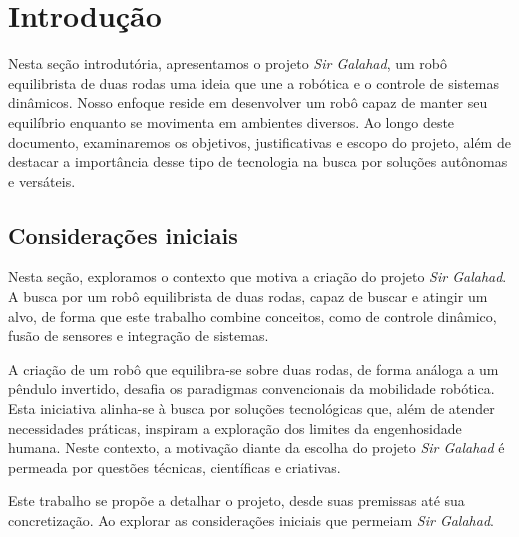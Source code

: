 
\chapter{Introdução}\label{cap:introducao}

Nesta seção introdutória, apresentamos o projeto \textit{Sir Galahad}, um robô equilibrista de duas rodas uma ideia que une a robótica e o controle de sistemas dinâmicos. Nosso enfoque reside em desenvolver um robô capaz de manter seu equilíbrio enquanto se movimenta em ambientes diversos. Ao longo deste documento, examinaremos os objetivos, justificativas e escopo do projeto, além de destacar a importância desse tipo de tecnologia na busca por soluções autônomas e versáteis.

\section{\textbf{Considerações iniciais}}

Nesta seção, exploramos o contexto que motiva a criação do projeto \textit{Sir Galahad}. A busca por um robô equilibrista de duas rodas, capaz de buscar e atingir um alvo, de forma que este trabalho combine conceitos, como de controle dinâmico, fusão de sensores e integração de sistemas. 

A criação de um robô que equilibra-se sobre duas rodas, de forma análoga a um pêndulo invertido, desafia os paradigmas convencionais da mobilidade robótica. Esta iniciativa alinha-se à busca por soluções tecnológicas que, além de atender necessidades práticas, inspiram a exploração dos limites da engenhosidade humana. Neste contexto, a motivação diante da escolha do projeto  \textit{Sir Galahad} é permeada por questões técnicas, científicas e criativas. 

Este trabalho se propõe a detalhar o projeto, desde suas premissas até sua concretização. Ao explorar as considerações iniciais que permeiam \textit{Sir Galahad}. 

